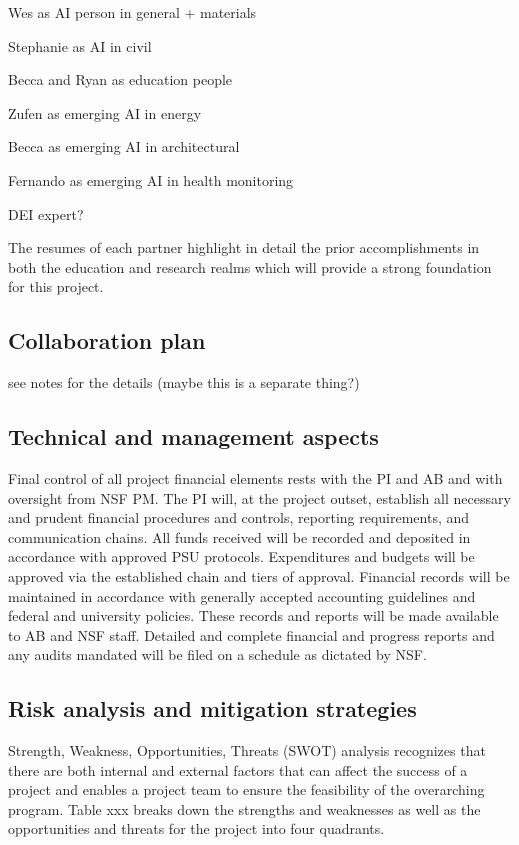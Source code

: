 \documentclass[11pt]{article}
\begin{document}
Wes as AI person in general + materials

Stephanie as AI in civil

Becca and Ryan as education people

Zufen as emerging AI in energy

Becca as emerging AI in architectural

Fernando as emerging AI in health monitoring 

DEI expert?

The resumes of each partner highlight in detail the prior accomplishments in both the education and research realms which will provide a strong foundation for this project. 

\subsection{Collaboration plan}
see notes for the details (maybe this is a separate thing?)

\subsection{Technical and management aspects}
Final control of all project financial elements rests with the PI and AB and with oversight from NSF PM.  The PI will, at the project outset, establish all necessary and prudent financial procedures and controls, reporting requirements, and communication chains. All funds received will be recorded and deposited in accordance with approved PSU protocols. Expenditures and budgets will be approved via the established chain and tiers of approval. Financial records will be maintained in accordance with generally accepted accounting guidelines and federal and university policies. These records and reports will be made available to AB and NSF staff. Detailed and complete financial and progress reports and any audits mandated will be filed on a schedule as dictated by NSF.

\subsection{Risk analysis and mitigation strategies}


Strength, Weakness, Opportunities, Threats (SWOT) analysis recognizes that there are both internal and external factors that can affect the success of a project and enables a project team to ensure the feasibility of the overarching program. 
Table xxx breaks down the strengths and weaknesses as well as the opportunities and threats for the project into four quadrants. 
\end{document}
